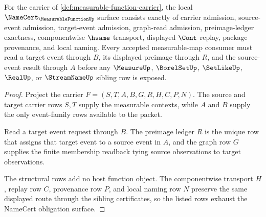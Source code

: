 \begin{theorem}
\label{thm:measurable-function-namecert-obligations}
For the carrier of \autoref{def:measurable-function-carrier}, the local $\NameCert_{\MeasurableFunctionUp}$ surface consists exactly of carrier admission, source-event admission, target-event admission, graph-read admission, preimage-ledger exactness, componentwise $\hsame$ transport, displayed $\Cont$ replay, package provenance, and local naming. Every accepted measurable-map consumer must read a target event through $B$, its displayed preimage through $R$, and the source-event result through $A$ before any $\MeasureUp$, $\BorelSetUp$, $\SetLikeUp$, $\RealUp$, or $\StreamNameUp$ sibling row is exposed.
\end{theorem}
\begin{proof}
Project the carrier $F=(S,T,A,B,G,R,H,C,P,N)$. The source and target carrier rows $S,T$ supply the measurable contexts, while $A$ and $B$ supply the only event-family rows available to the packet.

Read a target event request through $B$. The preimage ledger $R$ is the unique row that assigns that target event to a source event in $A$, and the graph row $G$ supplies the finite membership readback tying source observations to target observations.

The structural rows add no host function object. The componentwise transport $H$, replay row $C$, provenance row $P$, and local naming row $N$ preserve the same displayed route through the sibling certificates, so the listed rows exhaust the NameCert obligation surface.
\end{proof}

